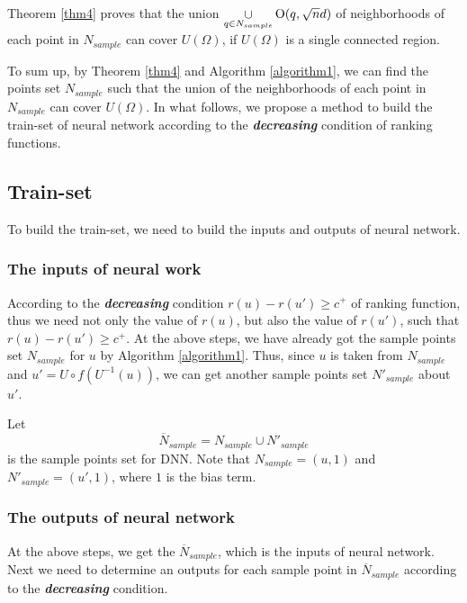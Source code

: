 \begin{rem}
	Theorem \ref{thm4} proves that the union $\mathop  \cup \limits_{q \in {N_{sample}}} {\rm O}(q,\sqrt n d)$ of neighborhoods of each point in $N_{sample}$ can cover $U(\Omega)$, if $U({\Omega})$ is a single connected region.
\end{rem}

To sum up, by Theorem \ref{thm4} and Algorithm \ref{algorithm1}, we can find the points set $N_{sample}$ such that the union of the neighborhoods of each point in $N_{sample}$ can cover $U(\Omega )$. 
In what follows, we propose a method to build the train-set of neural network according to the \textbf{\emph{decreasing}} condition of ranking functions. 
\subsection{Train-set}
\label{Train-set}
To build the train-set, we need to build the inputs and outputs of neural network.
\subsubsection{The inputs of neural work}
\label{The inputs of neural work}
According to the \textbf{\emph{decreasing}} condition $r(u)-r(u')\ge c^+$ of ranking function, thus we need not only the value of $r(u)$, but also the value of $r(u')$, such that $r(u)-r(u')\ge c^+$. At the above steps, we have already got the sample points set ${N_{sample}}$ for $u$ by Algorithm \ref{algorithm1}. Thus, since $u$ is taken from $N_{sample}$ and $u' = U \circ f({U^{ - 1}}(u))$, we can get another sample points set $N'_{sample}$ about $u'$.

Let
\begin{equation}\label{equ:N_sample and N_sample'}
{\overline N_{sample}}  = {N_{sample}} \cup {{N'}_{sample}}
\end{equation}
is the sample points set for DNN.
Note that ${N_{sample}} = (u,1)$ and ${{N'}_{sample}} = (u',1)$, where $1$ is the bias term.
\subsubsection{The outputs of neural network}
\label{The outputs of neural network}
At the above steps, we get the ${\overline N _{sample}}$, which is the inputs of neural network. Next we need to determine an outputs for each sample point in ${\overline N _{sample}}$ according to the \textbf{\emph{decreasing}} condition.

